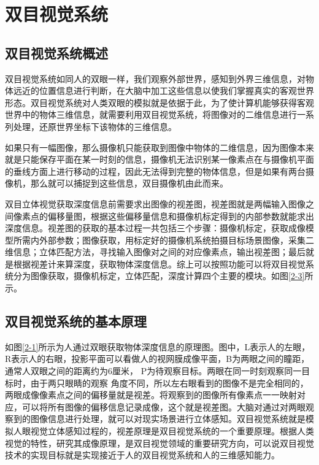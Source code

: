 
\chapter{双目视觉系统}

\section{双目视觉系统概述}
双目视觉系统如同人的双眼一样，我们观察外部世界，感知到外界三维信息，对物体远近的位置信息进行判断，在大脑中加工这些信息以使我们掌握真实的客观世界形态。双目视觉系统对人类双眼的模拟就是依据于此，为了使计算机能够获得客观世界中的物体三维信息，就需要利用双目视觉系统，将图像对的二维信息进行一系列处理，还原世界坐标下该物体的三维信息。

如果只有一幅图像，那么摄像机只能获取到图像中物体的二维信息，因为图像本来就是只能保存平面在某一时刻的信息，摄像机无法识别某一像素点在与摄像机平面的垂线方面上进行移动的过程，因此无法得到完整的物体信息，但是如果有两台摄像机，那么就可以捕捉到这些信息，双目摄像机由此而来。

双目立体视觉获取深度信息前需要求出图像的视差图，视差图就是两幅输入图像之间像素点的偏移量图，根据这些偏移量信息和摄像机标定得到的内部参数就能求出深度信息。视差图的获取的基本过程一共包括三个步骤：摄像机标定，获取成像模型所需内外部参数；图像获取，用标定好的摄像机系统拍摄目标场景图像，采集二维信息；立体匹配方法，寻找输入图像对之间的对应像素点，输出视差图；最后就是根据视差计来算深度，获取物体深度信息。综上可以按照功能可以将双目视觉系统分为图像获取，摄像机标定，立体匹配，深度计算四个主要的模块。如图\ref{2-3}所示。


\section{双目视觉系统的基本原理}

如图\ref{2-1}所示为人通过双眼获取物体深度信息的原理图。图中，L表示人的左眼，R表示人的右眼，投影平面可以看做人的视网膜成像平面，B为两眼之间的瞳距，通常人双眼之间的距离约为6厘米，
P为待观察目标。两眼在同一时刻观察同一目标时，由于两只眼睛的观察
角度不同，所以左右眼看到的图像不是完全相同的，两眼成像像素点之间的偏移量就是视差。将观察到的图像所有像素点一一映射对应，可以将所有图像的偏移信息记录成像，这个就是视差图。大脑对通过对两眼观察到的图像信息进行处理，就可以对现实场景进行立体感知。双目视觉系统就是模拟人眼视觉立体感知过程的，视差原理是双目视觉系统的一个重要原理。根据人类视觉的特性，研究其成像原理，是双目视觉领域的重要研究方向，可以说双目视觉技术的实现目标就是实现接近于人的双目视觉系统和人的三维感知能力。

